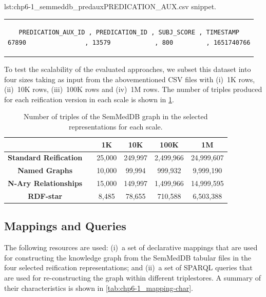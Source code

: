 \noindent\hspace{0.23\linewidth}\begin{minipage}{\linewidth}
\begin{captionedlisting}{lst:chp6-1_semmeddb_predaux}{PREDICATION\_AUX.csv snippet.}
\centering
\begin{tabular}{c}
\hspace{-7em}
{
\begin{lstlisting}[basicstyle=\ttfamily\small,label={lst:chp6-1_semmeddb_predaux},columns=flexible]
PREDICATION_AUX_ID , PREDICATION_ID , SUBJ_SCORE , TIMESTAMP
67890                , 13579            , 800         , 1651740766
\end{lstlisting}
}
\end{tabular}
\end{captionedlisting}
\end{minipage}


To test the scalability of the evaluated approaches, we subset this dataset into four sizes taking as input from the abovementioned CSV files with (i)~1K rows, (ii)~10K rows, (iii)~100K rows and (iv)~1M rows. The number of triples produced for each reification version in each scale is shown in \cref{tab:chp6-1_data-triple-number}.

\begin{table}[t]
\caption[SemMedDB scale sizes]{Number of triples of the SemMedDB graph in the selected representations for each scale.}
\label{tab:chp6-1_data-triple-number}
\centering
\begin{tabular}{cccccc}
    \cmidrule{2-6}
    & & \textbf{1K} & \textbf{10K} & \textbf{100K} & \textbf{1M} \\ \midrule
    \textbf{Standard Reification} & & 25,000 & 249,997 & 2,499,966 & 24,999,607 \\ \midrule
    \textbf{Named Graphs} & & 10,000 & 99,994 & 999,932 & 9,999,190 \\ \midrule
    \textbf{N-Ary Relationships} & & 15,000 & 149,997 & 1,499,966 & 14,999,595 \\ \midrule
    \textbf{RDF-star} & & 8,485 & 78,655 & 710,588 & 6,503,388 \\ \bottomrule
\end{tabular}
\end{table}




\subsection{Mappings and Queries}
\label{sec:chp6-1_map-queries}
The following resources are used: 
(i)~a set of declarative mappings that are used for constructing the knowledge graph from the SemMedDB tabular files in the four selected reification representations; and (ii)~a set of SPARQL queries that are used for re-constructing the graph within different triplestores. A summary of their characteristics is shown in \cref{tab:chp6-1_mapping-char}.

